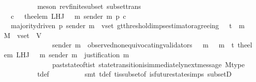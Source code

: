 \begin{isabellebody}
\ \ \ \ \ \ \ \ \isamarkupfalse%
\ {\isacharparenleft}meson\ rev{\isacharunderscore}finite{\isacharunderscore}subset\ subset{\isacharunderscore}trans{\isacharparenright}\ \isanewline
\ \ \ \ \ \ \isamarkupfalse%
\ \isamarkupfalse%
\ {\isachardoublequoteopen}{\isasymforall}\ c\ {\isasymin}\ {\isasymepsilon}\ {\isacharparenleft}the{\isacharunderscore}elem\ {\isacharparenleft}L{\isacharunderscore}H{\isacharunderscore}J\ {\isacharparenleft}{\isasymsigma}\ {\isasymunion}\ {\isacharbraceleft}m{\isacharbraceright}{\isacharparenright}\ {\isacharparenleft}sender\ m{\isacharparenright}{\isacharparenright}{\isacharparenright}{\isachardot}\ p\ c{\isachardoublequoteclose}\isanewline
\ \ \ \ \ \ \ \ \isamarkupfalse%
\ \ {\isacartoucheopen}majority{\isacharunderscore}driven\ p{\isacartoucheclose}\ {\isacartoucheopen}sender\ m\ {\isasymin}\ v{\isacharunderscore}set{\isacartoucheclose}\ gt{\isacharunderscore}threshold{\isacharunderscore}imps{\isacharunderscore}estimator{\isacharunderscore}agreeing\ {\isacartoucheopen}{\isasymsigma}\ {\isasymin}\ {\isasymSigma}t\ {\isasymand}\ m\ {\isasymin}\ M\ {\isasymand}\ v{\isacharunderscore}set\ {\isasymsubseteq}\ V{\isacartoucheclose}\isanewline
\ \ \ \ \ \ \ \ \ \ \ \ \ \ {\isacartoucheopen}sender\ m\ {\isasymin}\ observed{\isacharunderscore}non{\isacharunderscore}equivocating{\isacharunderscore}validators\ {\isacharparenleft}{\isasymsigma}\ {\isasymunion}\ {\isacharbraceleft}m{\isacharbraceright}{\isacharparenright}{\isacartoucheclose}\ {\isacartoucheopen}{\isasymsigma}\ {\isasymunion}\ {\isacharbraceleft}m{\isacharbraceright}\ {\isasymin}\ {\isasymSigma}t{\isacartoucheclose}\ {\isacartoucheopen}the{\isacharunderscore}elem\ {\isacharparenleft}L{\isacharunderscore}H{\isacharunderscore}J\ {\isacharparenleft}{\isasymsigma}\ {\isasymunion}\ {\isacharbraceleft}m{\isacharbraceright}{\isacharparenright}\ {\isacharparenleft}sender\ m{\isacharparenright}{\isacharparenright}\ {\isacharequal}\ justification\ m{\isacartoucheclose}\ \ \ \ \ \ \ \ \isanewline
\ \ \ \ \ \ \ \ \ \ \ \ \ \ past{\isacharunderscore}state{\isacharunderscore}of{\isacharunderscore}{\isasymSigma}t{\isacharunderscore}is{\isacharunderscore}{\isasymSigma}t\ state{\isacharunderscore}transition{\isacharunderscore}is{\isacharunderscore}immediately{\isacharunderscore}next{\isacharunderscore}message\ M{\isacharunderscore}type\isanewline
\ \ \ \ \ \ \ \ \isamarkupfalse%
\ {\isasymSigma}t{\isacharunderscore}def\isanewline
\ \ \ \ \ \ \ \ \isamarkupfalse%
\ {\isacharparenleft}smt\ {\isasymSigma}t{\isacharunderscore}def\ {\isasymSigma}t{\isacharunderscore}is{\isacharunderscore}subset{\isacharunderscore}of{\isacharunderscore}{\isasymSigma}\ is{\isacharunderscore}future{\isacharunderscore}state{\isachardot}simps\ subsetD{\isacharparenright}\isanewline

\end{isabellebody}
